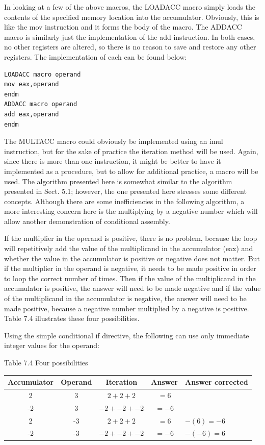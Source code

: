 \documentclass[10pt]{article}
\begin{document}
In looking at a few of the above macros, the LOADACC macro simply loads the contents of the specified memory location into the accumulator. Obviously, this is like the mov instruction and it forms the body of the macro. The ADDACC macro is similarly just the implementation of the add instruction. In both cases, no other registers are altered, so there is no reason to save and restore any other registers. The implementation of each can be found below:

\begin{verbatim}
LOADACC macro operand
mov eax,operand
endm
ADDACC macro operand
add eax,operand
endm
\end{verbatim}

The MULTACC macro could obviously be implemented using an imul instruction, but for the sake of practice the iteration method will be used. Again, since there is more than one instruction, it might be better to have it implemented as a procedure, but to allow for additional practice, a macro will be used. The algorithm presented here is somewhat similar to the algorithm presented in Sect. 5.1; however, the one presented here stresses some different concepts. Although there are some inefficiencies in the following algorithm, a more interesting concern here is the multiplying by a negative number which will allow another demonstration of conditional assembly.

If the multiplier in the operand is positive, there is no problem, because the loop will repetitively add the value of the multiplicand in the accumulator (eax) and whether the value in the accumulator is positive or negative does not matter. But if the multiplier in the operand is negative, it needs to be made positive in order to loop the correct number of times. Then if the value of the multiplicand in the accumulator is positive, the answer will need to be made negative and if the value of the multiplicand in the accumulator is negative, the answer will need to be made positive, because a negative number multiplied by a negative is positive. Table 7.4 illustrates these four possibilities.

Using the simple conditional if directive, the following can use only immediate integer values for the operand:

Table 7.4 Four possibilities

\begin{center}
\begin{tabular}{|ccccl|}
\hline
Accumulator & Operand & Iteration & Answer & Answer corrected \\
\hline
2 & 3 & $2+2+2$ & $=6$ &  \\
\hline
-2 & 3 & $-2+-2+-2$ & $=-6$ &  \\
2 & -3 & $2+2+2$ & $=6$ & $-(6)=-6$ \\
-2 & -3 & $-2+-2+-2$ & $=-6$ & $-(-6)=6$ \\
\hline
\end{tabular}
\end{center}
\end{document}
